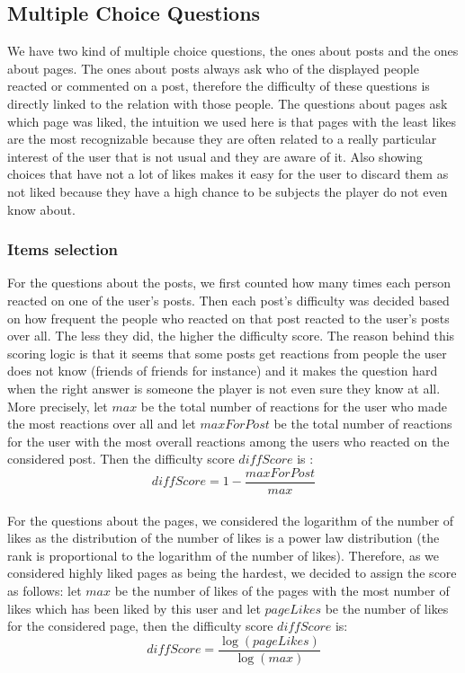 \subsection{Multiple Choice Questions}
We have two kind of multiple choice questions, the ones about posts and the ones about pages. The ones about posts always ask who of the displayed people reacted or commented on a post, therefore the difficulty of these questions is directly linked to the relation with those people. The questions about pages ask which page was liked, the intuition we used here is that pages with the least likes are the most recognizable because they are often related to a really particular interest of the user that is not usual and they are aware of it. Also showing choices that have not a lot of likes makes it easy for the user to discard them as not liked because they have a high chance to be subjects the player do not even know about.
\subsubsection{Items selection}
For the questions about the posts, we first counted how many times each person reacted on one of the user's posts. Then each post's difficulty was decided based on how frequent the people who reacted on that post reacted to the user's posts over all. The less they did, the higher the difficulty score. The reason behind this scoring logic is that it seems that some posts get reactions from people the user does not know (friends of friends for instance) and it makes the question hard when the right answer is someone the player is not even sure they know at all. More precisely, let $max$ be the total number of reactions for the user who made the most reactions over all and let $maxForPost$ be the total number of reactions for the user with the most overall reactions among the users who reacted on the considered post. Then the difficulty score $diffScore$ is : $$diffScore = 1 - \frac{maxForPost}{max}$$\\
For the questions about the pages, we considered the logarithm of the number of likes as the distribution of the number of likes is a power law distribution (the rank is proportional to the logarithm of the number of likes). Therefore, as we considered highly liked pages as being the hardest, we decided to assign the score as follows: let $max$ be the number of likes of the pages with the most number of likes which has been liked by this user and let $pageLikes$ be the number of likes for the considered page, then the difficulty score $diffScore$ is: $$diffScore = \frac{\log(pageLikes)}{\log(max)}$$
